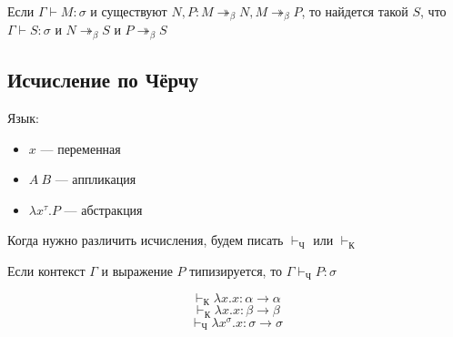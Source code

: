 \begin{theorem}
    Если \(\Gamma \vdash M : \sigma\) и существуют \(N, P : M \twoheadrightarrow_\beta N, M \twoheadrightarrow_\beta P\), то найдется такой \(S\), что \(\Gamma \vdash S : \sigma\) и \(N \twoheadrightarrow_\beta S\) и \(P \twoheadrightarrow_\beta S\)
\end{theorem}

\subsection{Исчисление по Чёрчу}

Язык:
\begin{itemize}
    \item \(x\) --- переменная
    \item \(A\ B\) --- аппликация
    \item \(\lambda x^\tau.P\) --- абстракция
\end{itemize}

\begin{obozn}
    Когда нужно различить исчисления, будем писать \( \vdash_{\mathrm{Ч}}\) или \( \vdash_{\mathrm{К}}\)
\end{obozn}

\begin{theorem}
    Если контекст \(\Gamma\) и выражение \(P\) типизируется, то \(\Gamma \vdash_{\mathrm{Ч}} P : \sigma\)
\end{theorem}

\begin{example}
    \[ \vdash_{\mathrm{К}} \lambda x.x : \alpha \to \alpha\]
    \[ \vdash_{\mathrm{К}} \lambda x.x : \beta \to \beta\]
    \[ \vdash_{\mathrm{Ч}} \lambda x^\sigma.x : \sigma \to \sigma\]
\end{example}

